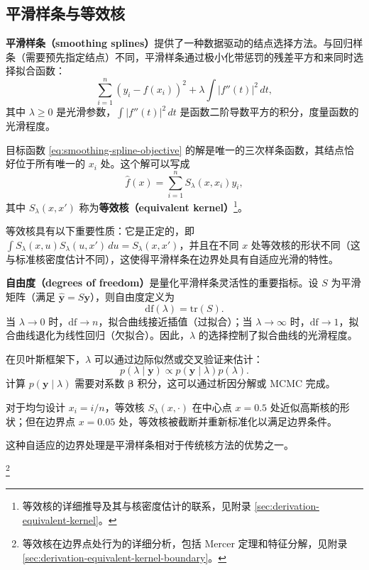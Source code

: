 \subsection{平滑样条与等效核}\label{sec:smoothing-splines}

\textbf{平滑样条（smoothing splines）}提供了一种数据驱动的结点选择方法。与回归样条（需要预先指定结点）不同，平滑样条通过极小化带惩罚的残差平方和来同时选择拟合函数：
\begin{equation}
\sum_{i=1}^{n} (y_i - f(x_i))^2 + \lambda \int |f''(t)|^2\, dt,
\label{eq:smoothing-spline-objective}
\end{equation}
其中 $\lambda \geq 0$ 是光滑参数，$\int |f''(t)|^2\, dt$ 是函数二阶导数平方的积分，度量函数的光滑程度。

目标函数 \eqref{eq:smoothing-spline-objective} 的解是唯一的三次样条函数，其结点恰好位于所有唯一的 $x_i$ 处。这个解可以写成
\begin{equation}
\hat{f}(x) = \sum_{i=1}^{n} S_\lambda(x, x_i) y_i,
\label{eq:smoothing-spline-solution}
\end{equation}
其中 $S_\lambda(x, x')$ 称为\textbf{等效核（equivalent kernel）}\footnote{等效核的详细推导及其与核密度估计的联系，见附录 \cref{sec:derivation-equivalent-kernel}。}。

等效核具有以下重要性质：它是正定的，即 $\int S_\lambda(x, u) S_\lambda(u, x')\, du = S_\lambda(x, x')$，并且在不同 $x$ 处等效核的形状不同（这与标准核密度估计不同），这使得平滑样条在边界处具有自适应光滑的特性。

\textbf{自由度（degrees of freedom）}是量化平滑样条灵活性的重要指标。设 $S$ 为平滑矩阵（满足 $\hat{\mathbf{y}} = S \mathbf{y}$），则自由度定义为
\begin{equation}
\mathrm{df}(\lambda) = \mathrm{tr}(S).
\label{eq:smoothing-spline-df}
\end{equation}
当 $\lambda \to 0$ 时，$\mathrm{df} \to n$，拟合曲线接近插值（过拟合）；当 $\lambda \to \infty$ 时，$\mathrm{df} \to 1$，拟合曲线退化为线性回归（欠拟合）。因此，$\lambda$ 的选择控制了拟合曲线的光滑程度。

在贝叶斯框架下，$\lambda$ 可以通过边际似然或交叉验证来估计：
\begin{equation}
p(\lambda \mid \mathbf{y}) \propto p(\mathbf{y} \mid \lambda) p(\lambda).
\label{eq:smoothing-spline-lambda-posterior}
\end{equation}
计算 $p(\mathbf{y} \mid \lambda)$ 需要对系数 $\boldsymbol{\beta}$ 积分，这可以通过析因分解或 MCMC 完成。

\begin{Example}[等效核的可视化]\label{ex:equivalent-kernel-visualization}
对于均匀设计 $x_i = i/n$，等效核 $S_\lambda(x, \cdot)$ 在中心点 $x = 0.5$ 处近似高斯核的形状；但在边界点 $x = 0.05$ 处，等效核被截断并重新标准化以满足边界条件。

这种自适应的边界处理是平滑样条相对于传统核方法的优势之一。
\end{Example}
\footnote{等效核在边界点处行为的详细分析，包括 Mercer 定理和特征分解，见附录 \cref{sec:derivation-equivalent-kernel-boundary}。}

